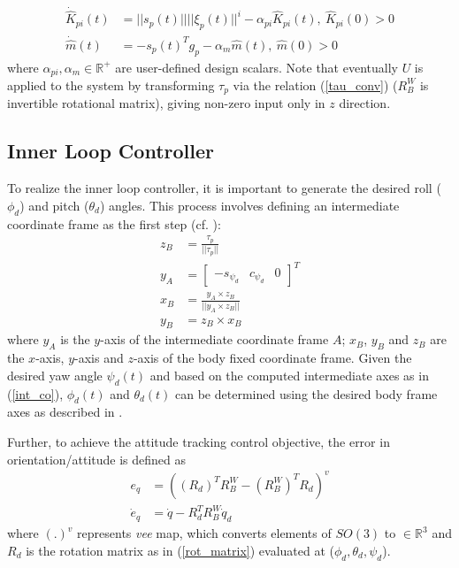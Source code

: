     \begin{subequations}\label{adap_out}
\begin{align}
    \dot{\hat{K}}_{pi}(t) &= ||s_p(t)|| ||\xi_p(t)||^i - \alpha_{pi} \hat{K}_{pi}(t), ~\hat{K}_{pi}(0) > 0  \label{p_adap_K} \\
    \dot{\hat{m}}(t) &= - s_p(t)^T g_p - \alpha_m \hat{m}(t), ~ \hat{m}(0) > 0\label{p_adap_m}
\end{align}
\end{subequations}
where $\alpha_{pi}, \alpha_m  \in \mathbb{R}^{+}$ are user-defined design scalars. Note that eventually $U$ is applied to the system by transforming $\tau_p$ via the relation (\ref{tau_conv}) ($R^W_B$ is invertible rotational matrix), giving non-zero input only in $z$ direction.

\subsection{Inner Loop Controller}
To realize the inner loop controller, it is important to generate the desired roll ($\phi_d$) and pitch ($\theta_d$) angles. This process involves defining an intermediate coordinate frame as the first step (cf. \cite{mellinger2011minimum}):
\begin{subequations}\label{int_co}
\begin{align}
    z_B &= \frac{\tau_p}{||\tau_p||} \\
    y_A &= \begin{bmatrix}
    -s_{\psi_d} & c_{\psi_d} & 0
\end{bmatrix}^T \\
    x_B &= \frac{y_A \times z_B}{||y_A \times z_B||} \\
    y_B &= z_B \times x_B
\end{align}
\end{subequations}
where $y_A$ is the $y$-axis of the intermediate coordinate frame $A$; $x_B$, $y_B$ and $z_B$ are the $x$-axis, $y$-axis and $z$-axis of the body fixed coordinate frame. Given the desired yaw angle $\psi_d (t)$ and based on the computed intermediate axes as in (\ref{int_co}), $\phi_d (t)$ and $\theta_d (t)$ can be determined using the desired body frame axes as described in \cite{mellinger2011minimum}. 

Further, to achieve the attitude tracking control objective, the error in orientation/attitude is defined as \cite{mellinger2011minimum}
\begin{align}
    e_q &= {((R_d)^T R_B^W - (R_B^W)^T R_d)}^{v} \label{q_err} \\
    \dot{e}_q & = \dot{q} - R_d^T R_B^W \dot{q}_d
\end{align}
where $(.)^v$ represents \textit{vee} map, which converts elements of $SO(3)$ to $\in{\mathbb{R}^3}$ \cite{mellinger2011minimum} and $R_d$ is the rotation matrix as in (\ref{rot_matrix}) evaluated at ($\phi_d, \theta_d, \psi_d$).

